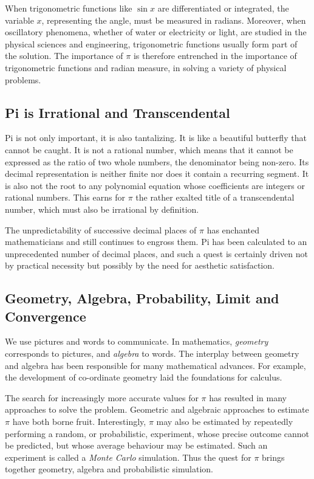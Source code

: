 \documentclass[11pt,a4paper,onecolumn]{article}
\begin{document}
When trigonometric functions like $\sin x$ are differentiated or integrated, the variable $x$, representing the angle, must be measured in radians.  Moreover, when oscillatory phenomena, whether of water or electricity or light, are studied in the physical sciences and engineering, trigonometric functions usually form part of the solution.  The importance of $\pi$ is therefore entrenched in the importance of trigonometric functions and radian measure, in solving a variety of physical problems.

\subsection{Pi is Irrational and Transcendental}

Pi is not only important, it is also tantalizing.  It is like a
beautiful butterfly that cannot be caught.  It is not a rational
number, which means that it cannot be expressed as the ratio of two
whole numbers, the denominator being non-zero.  Its decimal
representation is neither finite nor does it contain a recurring
segment.  It is also not the root to any polynomial equation whose
coefficients are integers or rational numbers.  This earns for $\pi$
the rather exalted title of a transcendental number, which must also be
irrational by definition.

The unpredictability of successive decimal places of $\pi$ has
enchanted mathematicians and still continues to engross them.  Pi has
been calculated to an unprecedented number of decimal places, and such
a quest is certainly driven not by practical necessity but possibly by
the need for aesthetic satisfaction.

\subsection{Geometry, Algebra, Probability, Limit and Convergence}

We use pictures and words to communicate.  In mathematics,
\emph{geometry} corresponds to pictures, and \emph{algebra} to words. 
The interplay between geometry and algebra has been responsible for
many mathematical advances.  For example, the development of co-ordinate
geometry laid the foundations for calculus.

The search for increasingly more accurate values for $\pi$ has resulted
in many approaches to solve the problem.  Geometric and algebraic
approaches to estimate $\pi$ have both borne fruit.  Interestingly,
$\pi$ may also be estimated by repeatedly performing a random, or
probabilistic, experiment, whose precise outcome cannot be predicted,
but whose average behaviour may be estimated.  Such an experiment is
called a \emph{Monte Carlo} simulation.  Thus the quest for $\pi$
brings together geometry, algebra and probabilistic simulation.
\end{document}
